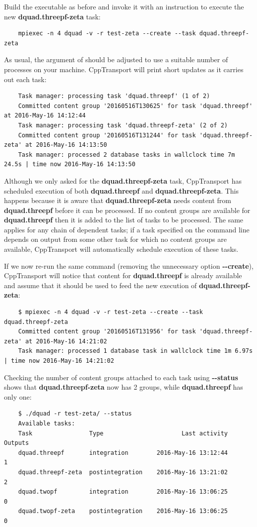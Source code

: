 \documentclass[11pt,a4paper]{article}
\renewcommand{\texttt}[1]{{\ttfamily\fontseries{l}\selectfont{#1}}}
\newcommand{\repoobject}[1]{{\ttfamily\bfseries\small #1}}
\newcommand{\packagefont}{\sffamily}
\newcommand{\CppTransport}{{\packagefont CppTransport}}
\newcommand{\file}[1]{\texttt{{#1}}}
\newcommand{\option}[1]{{\ttfamily\bfseries\small #1}}
\begin{document}
Build the \file{dquad} executable as before and invoke it
with an instruction to execute the
new \repoobject{dquad.threepf-zeta} task:
\begin{verbatim}
    mpiexec -n 4 dquad -v -r test-zeta --create --task dquad.threepf-zeta    
\end{verbatim}
As usual, the \texttt{-n} argument of
\texttt{mpiexec} should be adjusted to use a suitable
number of processes on your machine.
{\CppTransport} will print short updates as it carries out each
task:
\begin{verbatim}
    Task manager: processing task 'dquad.threepf' (1 of 2)
    Committed content group '20160516T130625' for task 'dquad.threepf' at 2016-May-16 14:12:44
    Task manager: processing task 'dquad.threepf-zeta' (2 of 2)
    Committed content group '20160516T131244' for task 'dquad.threepf-zeta' at 2016-May-16 14:13:50
    Task manager: processed 2 database tasks in wallclock time 7m 24.5s | time now 2016-May-16 14:13:50
\end{verbatim}
Although we only asked for the
\repoobject{dquad.threepf-zeta} task,
{\CppTransport} has scheduled execution of both
\repoobject{dquad.threepf} and \repoobject{dquad.threepf-zeta}.
This happens because it is aware that
\repoobject{dquad.threepf-zeta} needs content
from \repoobject{dquad.threepf} before it can be processed.
If no content groups are available for
\repoobject{dquad.threepf} then it is added to the list of tasks
to be processed.
The same applies for any chain of dependent tasks;
if a task specified on the command line depends on output from
some other task for which no content groups are available,
{\CppTransport} will automatically schedule execution of these tasks.

If we now re-run the same command
(removing the unnecessary option \option{{-}{-}create}),
{\CppTransport} will notice that
content for \repoobject{dquad.threepf} is already available
and assume that it should be used to feed
the new execution of
\repoobject{dquad.threepf-zeta}:
\begin{verbatim}
    $ mpiexec -n 4 dquad -v -r test-zeta --create --task dquad.threepf-zeta
    Committed content group '20160516T131956' for task 'dquad.threepf-zeta' at 2016-May-16 14:21:02
    Task manager: processed 1 database task in wallclock time 1m 6.97s | time now 2016-May-16 14:21:02
\end{verbatim}
Checking the number of content groups attached to each task using
\option{{-}{-}status} shows that
\repoobject{dquad.threepf-zeta} now has 2 groups, while
\repoobject{dquad.threepf} has only one:
\begin{verbatim}    
    $ ./dquad -r test-zeta/ --status
    Available tasks:
    Task                Type                      Last activity  Outputs
    dquad.threepf       integration        2016-May-16 13:12:44        1
    dquad.threepf-zeta  postintegration    2016-May-16 13:21:02        2
    dquad.twopf         integration        2016-May-16 13:06:25        0
    dquad.twopf-zeta    postintegration    2016-May-16 13:06:25        0
\end{verbatim}
\end{document}
